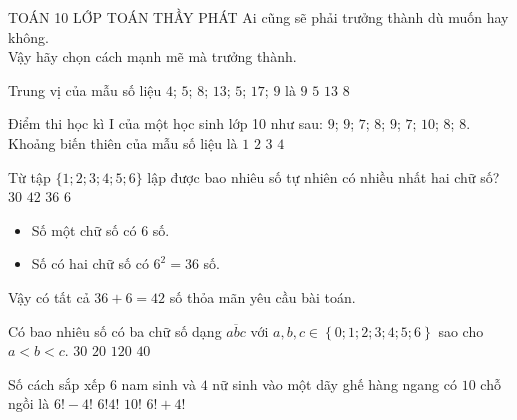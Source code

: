 \begin{name}
	{\tenchude}
	{TOÁN 10}
	{LỚP TOÁN THẦY PHÁT}
	{{Ai cũng sẽ phải trưởng thành dù muốn hay không.\\ Vậy hãy chọn cách mạnh mẽ mà trưởng thành.}}
\end{name}
\TN
\begin{ex}%
Trung vị của mẫu số liệu $4$; $5$; $8$; $13$; $5$; $17$; $9$ là
\choice
{$9$}
{$5$}
{$13$}
{\True $8$}
\end{ex}

\begin{ex}%
Điểm thi học kì I của một học sinh lớp 10 như sau: $9$; $9$; $7$; $8$; $9$; $7$; $10$; $8$; $8$. Khoảng biến thiên của mẫu số liệu là
\choice
{$1$}
{$2$}
{\True$3$}
{$4$}
\end{ex}

\begin{ex}%
Từ tập $\{1;2;3;4;5;6\}$ lập được bao nhiêu số tự nhiên có nhiều nhất hai chữ số?
\choice
{$30$}
{\True $42$}
{$36$}
{$6$}
\loigiai
{
\begin{itemize}
\item Số một chữ số có $6$ số.
\item Số có hai chữ số có $6^2=36$ số.
\end{itemize}
Vậy có tất cả $36+6=42$ số thỏa mãn yêu cầu bài toán.
}
\end{ex}

\begin{ex}%
Có bao nhiêu số có ba chữ số dạng $\overline{abc}$ với $a, b, c\in\left\{{0;1;2;3;4;5;6}\right\}$ sao cho $ a < b < c$.
\choice
{$ 30$}
{\True $ 20$}
{$ 120$}
{$ 40$}
\end{ex}

\begin{ex}%
Số cách sắp xếp $6$ nam sinh và $4$ nữ sinh vào một dãy ghế hàng ngang có $10$ chỗ ngồi là
\choice
{$6!-4!$}
{$6!4!$}
{\True $10!$}
{$6!+4!$}
\end{ex}

